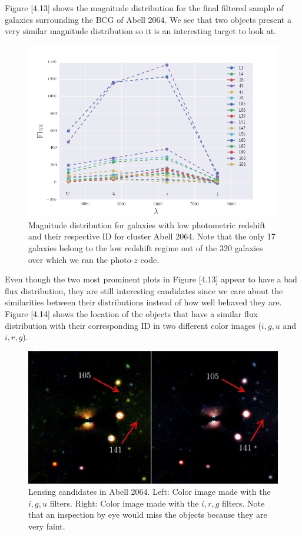 Figure [4.13] shows the magnitude distribution for the final filtered sample of galaxies surrounding the BCG of Abell 2064. We see that two objects present a very similar magnitude distribution so it is an interesting target to look at. 

\begin{figure}[H]
\centering
\includegraphics[width=15cm]{images/magnitude_distribution_A2064.png}
\caption[Magnitude distribution of galaxies in Abell 2064]{Magnitude distribution for galaxies with low photometric redshift and their respective ID for cluster Abell 2064. Note that the only 17 galaxies belong to the low redshift regime out of the 320 galaxies over which we ran the photo-$z$ code.}
\end{figure}

Even though the two most prominent plots in Figure [4.13] appear to have a bad flux distribution, they are still interesting candidates since we care about the similarities between their distributions instead of how well behaved they are. Figure [4.14] shows the location of the objects that have a similar flux distribution with their corresponding ID in two different color images ($i,g,u$ and $i,r,g$).

\begin{figure}[H]
\centering
\includegraphics[width=15cm]{images/candidates.jpg}
\caption[Lensing candidates Abell 2064]{Lensing candidates in Abell 2064. Left: Color image made with the $i,g,u$ filters. Right: Color image made with the $i,r,g$ filters. Note that an inspection by eye would miss the objects because they are very faint.}
\end{figure}

